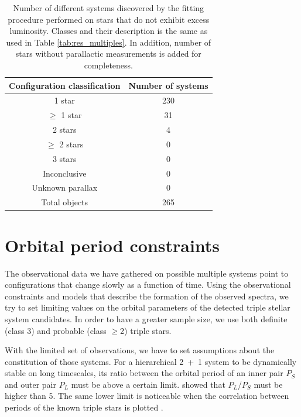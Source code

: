 \begin{table}
	\centering
	\caption{Number of different systems discovered by the fitting procedure performed on stars that do not exhibit excess luminosity. Classes and their description is the same as used in Table \ref{tab:res_multiples}. In addition, number of stars without parallactic measurements is added for completeness.}
	\begin{tabular}{c c}
		\hline
		Configuration classification & Number of systems \\ 
		\hline
		1 star & 230 \\
		$\geq$ 1 star & 31 \\
		2 stars & 4 \\
		$\geq$ 2 stars & 0 \\
		3 stars & 0 \\
		Inconclusive & 0 \\
		Unknown parallax & 0 \\
		\hline
		Total objects & 265 \\
		\hline
	\end{tabular}
	\label{tab:res_single}
\end{table}


\section{Orbital period constraints}
\label{sec:orital_periods}
The observational data we have gathered on possible multiple systems point to configurations that change slowly as a function of time. Using the observational constraints and models that describe the formation of the observed spectra, we try to set limiting values on the orbital parameters of the detected triple stellar system candidates. In order to have a greater sample size, we use both definite (class 3) and probable (class $\geq$2) triple stars.

With the limited set of observations, we have to set assumptions about the constitution of those systems. For a hierarchical 2~+~1 system to be dynamically stable on long timescales, its ratio between the orbital period of an inner pair $P_S$ and outer pair $P_L$ must be above a certain limit. \citet{2006epbm.book.....E} showed that $P_L$/$P_S$ must be higher than 5. The same lower limit is noticeable when the correlation between periods of the known triple stars is plotted \cite{2008MNRAS.389..925T, 2018ApJS..235....6T}.

